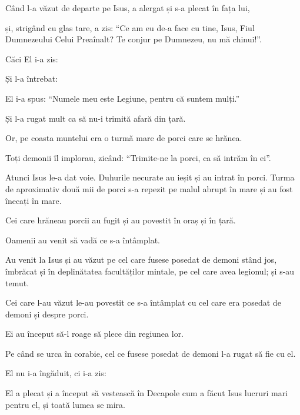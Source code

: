 {Când l-a văzut de departe pe Isus, a alergat și s-a plecat în fața lui,

și, strigând cu glas tare, a zis: “Ce am eu de-a face cu tine, Isus, Fiul Dumnezeului Celui Preaînalt? Te conjur pe Dumnezeu, nu mă chinui!”.

Căci El i-a zis:
{}


\par }{\PP {}Și l-a întrebat:
{}

\par }{\PP El i-a spus: “Numele meu este Legiune, pentru că suntem mulți.”

Și l-a rugat mult ca să nu-i trimită afară din țară.

Or, pe coasta muntelui era o turmă mare de porci care se hrănea.

Toți demonii îl implorau, zicând: “Trimite-ne la porci, ca să intrăm în ei”.


\par }{\PP {}Atunci Isus le-a dat voie. Duhurile necurate au ieșit și au intrat în porci. Turma de aproximativ două mii de porci s-a repezit pe malul abrupt în mare și au fost înecați în mare.

Cei care hrăneau porcii au fugit și au povestit în oraș și în țară.

\par }{\PP Oamenii au venit să vadă ce s-a întâmplat.

Au venit la Isus și au văzut pe cel care fusese posedat de demoni stând jos, îmbrăcat și în deplinătatea facultăților mintale, pe cel care avea legionul; și s-au temut.

Cei care l-au văzut le-au povestit ce s-a întâmplat cu cel care era posedat de demoni și despre porci.

Ei au început să-l roage să plece din regiunea lor.


\par }{\PP {}Pe când se urca în corabie, cel ce fusese posedat de demoni l-a rugat să fie cu el.

El nu i-a îngăduit, ci i-a zis:
{}


\par }{\PP {}El a plecat și a început să vestească în Decapole cum a făcut Isus lucruri mari pentru el, și toată lumea se mira.


}
